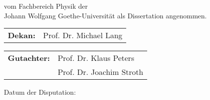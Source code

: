 \begin{titlepage}
\thispagestyle{empty}

\vspace*{0.5\textheight}

\noindent{}%
vom Fachbereich Physik der \\[2pt]
Johann Wolfgang Goethe-Universit\"at als Dissertation angenommen.

\vspace*{2cm}

\noindent{}%
\begin{tabular}{@{}l@{\hskip 1ex}l}
  \bf{Dekan}: & Prof. Dr. Michael Lang
\end{tabular}

\vspace*{1cm}

\noindent{}%
\begin{tabular}{@{}l@{\hskip 1ex}l}
    \bf{Gutachter}: & Prof. Dr. Klaus Peters\\
                    & Prof. Dr. Joachim Stroth
\end{tabular}

\vspace*{2cm}
\noindent{}%
Datum der Disputation:
\end{titlepage}